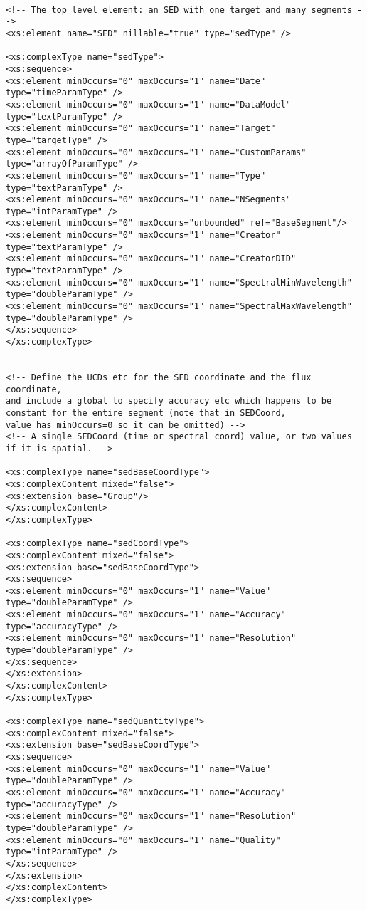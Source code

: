 {\begin{flushleft}
\begin{fmppage}
\begin{verbatim}
\end{verbatim}
\end{fmppage}

\begin{fmppage}
\begin{verbatim}

<!-- The top level element: an SED with one target and many segments -->
<xs:element name="SED" nillable="true" type="sedType" />

<xs:complexType name="sedType">
<xs:sequence>
<xs:element minOccurs="0" maxOccurs="1" name="Date" type="timeParamType" />
<xs:element minOccurs="0" maxOccurs="1" name="DataModel" type="textParamType" />
<xs:element minOccurs="0" maxOccurs="1" name="Target" type="targetType" />
<xs:element minOccurs="0" maxOccurs="1" name="CustomParams" type="arrayOfParamType" />
<xs:element minOccurs="0" maxOccurs="1" name="Type" type="textParamType" />
<xs:element minOccurs="0" maxOccurs="1" name="NSegments" type="intParamType" />
<xs:element minOccurs="0" maxOccurs="unbounded" ref="BaseSegment"/>
<xs:element minOccurs="0" maxOccurs="1" name="Creator" type="textParamType" />
<xs:element minOccurs="0" maxOccurs="1" name="CreatorDID" type="textParamType" />
<xs:element minOccurs="0" maxOccurs="1" name="SpectralMinWavelength" type="doubleParamType" />
<xs:element minOccurs="0" maxOccurs="1" name="SpectralMaxWavelength" type="doubleParamType" />
</xs:sequence>
</xs:complexType>


<!-- Define the UCDs etc for the SED coordinate and the flux coordinate,
and include a global to specify accuracy etc which happens to be
constant for the entire segment (note that in SEDCoord,
value has minOccurs=0 so it can be omitted) -->
<!-- A single SEDCoord (time or spectral coord) value, or two values if it is spatial. -->

<xs:complexType name="sedBaseCoordType">
<xs:complexContent mixed="false">
<xs:extension base="Group"/>
</xs:complexContent>
</xs:complexType>

<xs:complexType name="sedCoordType">
<xs:complexContent mixed="false">
<xs:extension base="sedBaseCoordType">
<xs:sequence>
<xs:element minOccurs="0" maxOccurs="1" name="Value" type="doubleParamType" />
<xs:element minOccurs="0" maxOccurs="1" name="Accuracy" type="accuracyType" />
<xs:element minOccurs="0" maxOccurs="1" name="Resolution" type="doubleParamType" />
</xs:sequence>
</xs:extension>
</xs:complexContent>
</xs:complexType>

<xs:complexType name="sedQuantityType">
<xs:complexContent mixed="false">
<xs:extension base="sedBaseCoordType">
<xs:sequence>
<xs:element minOccurs="0" maxOccurs="1" name="Value" type="doubleParamType" />
<xs:element minOccurs="0" maxOccurs="1" name="Accuracy" type="accuracyType" />
<xs:element minOccurs="0" maxOccurs="1" name="Resolution" type="doubleParamType" />
<xs:element minOccurs="0" maxOccurs="1" name="Quality" type="intParamType" />
</xs:sequence>
</xs:extension>
</xs:complexContent>
</xs:complexType>



\end{verbatim}
\end{fmppage}
\end{flushleft}}
